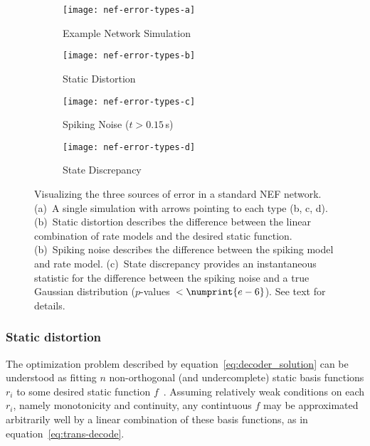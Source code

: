 \begin{figure}
  \centering
  \begin{subfigure}{\textwidth}
    \centering
    \texttt{[image: nef-error-types-a]}
    \caption{Example Network Simulation}
    \label{fig:nef-error-types-a}
  \end{subfigure}
  \begin{subfigure}{.33\textwidth}
    \centering
    \texttt{[image: nef-error-types-b]}
    \caption{Static Distortion}
    \label{fig:nef-error-types-b}
  \end{subfigure}%
  \begin{subfigure}{.33\textwidth}
    \centering
    \texttt{[image: nef-error-types-c]}
    \caption{Spiking Noise ($t > 0.15$\,s)}
    \label{fig:nef-error-types-c}
  \end{subfigure}%
  \begin{subfigure}{.33\textwidth}
    \centering
    \texttt{[image: nef-error-types-d]}
    \caption{State Discrepancy}
    \label{fig:nef-error-types-d}
  \end{subfigure}
  \caption{ \label{fig:nef-error-types}
    Visualizing the three sources of error in a standard NEF network.
    (a)~A single simulation with arrows pointing to each type (b, c, d).
    (b)~Static distortion describes the difference between the linear combination of rate models and the desired static function.
    (b)~Spiking noise describes the difference between the spiking model and rate model.
    (c)~State discrepancy provides an instantaneous statistic for the difference between the spiking noise and a true Gaussian distribution ($p$-values~$< \numprint{e-6}$).
    See text for details.
  }
\end{figure}


\subsubsection{Static distortion}

The optimization problem described by equation~\ref{eq:decoder_solution} can be understood as fitting $n$ non-orthogonal (and undercomplete) static basis functions $r_i$ to some desired static function $f$~\citep{broomhead1988radial}.
Assuming relatively weak conditions on each $r_i$, namely monotonicity and continuity, any contintuous $f$ may be approximated arbitrarily well by a linear combination of these basis functions, as in equation~\ref{eq:trans-decode}.


